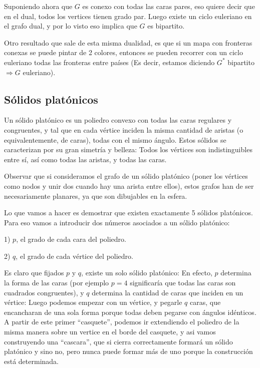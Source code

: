 \documentclass{article}
\begin{document}
Suponiendo ahora que $G$ es conexo con todas las caras pares, eso quiere decir que en el
dual, todos los vertices tienen grado par. Luego existe un ciclo euleriano en el grafo dual, y por lo visto eso implica que
$G$ es bipartito.

Otro resultado que sale de esta misma dualidad, es que si un mapa con fronteras conexas se puede pintar de 2 colores,
entonces se pueden recorrer con un ciclo euleriano todas las fronteras entre países 
(Es decir, estamos diciendo $G^*$ bipartito $\Rightarrow G$ euleriano).

\subsection{Sólidos platónicos}

Un sólido platónico es un poliedro convexo con todas las caras regulares y congruentes, y tal que en cada vértice inciden la misma cantidad
de aristas (o equivalentemente, de caras), todas con el mismo ángulo. Estos sólidos se caracterizan por su gran simetría y belleza: Todos los vértices
son indistinguibles entre sí, así como todas las aristas, y todas las caras.

Observar que si consideramos el grafo de un sólido platónico (poner los vértices como nodos y unir dos cuando hay una arista entre ellos),
estos grafos han de ser necesariamente planares, ya que son dibujables en la esfera.

Lo que vamos a hacer es demostrar que existen exactamente 5 sólidos platónicos. Para eso vamos a introducir dos números asociados a un sólido
platónico:

1) $p$, el grado de cada cara del poliedro.

2) $q$, el grado de cada vértice del poliedro.

Es claro que fijados $p$ y $q$, existe un solo sólido platónico: En efecto, $p$ determina la forma de las caras (por ejemplo $p=4$ significaría
que todas las caras son cuadrados congruentes), y $q$ determina la cantidad de caras que inciden en un vértice: Luego podemos empezar con un
vértice, y pegarle $q$ caras, que encancharan de una sola forma porque todas deben pegarse con ángulos idénticos. A partir de este primer
``casquete'', podemos ir extendiendo el poliedro de la misma manera sobre un vertice en el borde del casquete, y asi vamos construyendo
una ``cascara'', que si cierra correctamente formará un sólido platónico y sino no, pero nunca puede formar más de uno porque la construcción
está determinada.
\end{document}
